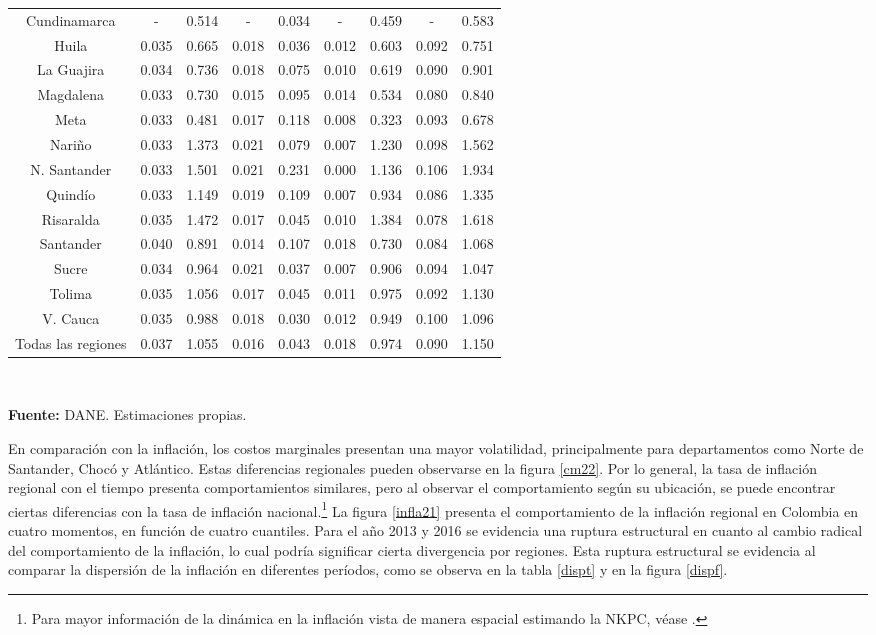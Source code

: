\begin{table}[H]
\begin{tabular}{c c c c c c c c c }
    Cundinamarca  & - & 0.514 & - & 0.034 & - & 0.459 & - & 0.583 \\
    Huila  & 0.035 & 0.665 & 0.018 & 0.036 & 0.012 & 0.603 & 0.092 & 0.751 \\
    La Guajira & 0.034 & 0.736 & 0.018 & 0.075 & 0.010 & 0.619 & 0.090 & 0.901 \\
    Magdalena  & 0.033 & 0.730 & 0.015 & 0.095 & 0.014 & 0.534 & 0.080 & 0.840 \\
    Meta  & 0.033 & 0.481 & 0.017 & 0.118 & 0.008 & 0.323 & 0.093 & 0.678 \\
    Nariño  & 0.033 & 1.373 & 0.021 & 0.079 & 0.007 & 1.230 & 0.098 & 1.562 \\
    N. Santander  & 0.033 & 1.501 & 0.021 & 0.231 & 0.000 & 1.136 & 0.106 & 1.934 \\
    Quindío  & 0.033 & 1.149 & 0.019 & 0.109 & 0.007 & 0.934 & 0.086 & 1.335 \\
    Risaralda  & 0.035 & 1.472 & 0.017 & 0.045 & 0.010 & 1.384 & 0.078 & 1.618 \\
    Santander  & 0.040 & 0.891 & 0.014 & 0.107 & 0.018 & 0.730 & 0.084 & 1.068 \\
    Sucre  & 0.034 & 0.964 & 0.021 & 0.037 & 0.007 & 0.906 & 0.094 & 1.047 \\
    Tolima  & 0.035 & 1.056 & 0.017 & 0.045 & 0.011 & 0.975 & 0.092 & 1.130 \\
    V. Cauca  & 0.035 & 0.988 & 0.018 & 0.030 & 0.012 & 0.949 & 0.100 & 1.096 \\
    Todas las regiones & 0.037 & 1.055 & 0.016 & 0.043 & 0.018 & 0.974 & 0.090 & 1.150 \\
     \hline
    \end{tabular}%
  \label{res3}\\
  \raggedright  \scriptsize \textbf{Fuente:} DANE. Estimaciones propias.
\end{table}%
 En comparación con la inflación, los costos marginales presentan una mayor volatilidad, principalmente para departamentos como Norte de Santander, Chocó y Atlántico. Estas diferencias regionales pueden observarse en la figura \ref{cm22}. Por lo general, la tasa de inflación regional con el tiempo presenta comportamientos similares, pero al observar el comportamiento según su ubicación, se puede encontrar ciertas diferencias  con la tasa de inflación nacional.\footnote{Para mayor información de la dinámica en  la inflación vista de manera espacial estimando la NKPC, véase \cite{yesilyurt2014regional,vaona2012regional}.} La figura \ref{infla21} presenta el comportamiento de la inflación regional en Colombia en cuatro momentos, en función de cuatro cuantiles. Para el año 2013 y 2016 se evidencia una ruptura estructural en cuanto al cambio radical del comportamiento de la inflación, lo cual  podría  significar cierta divergencia por regiones. Esta ruptura estructural se evidencia al comparar la dispersión de la inflación en diferentes períodos, como se observa en la tabla \ref{dispt} y en la figura \ref{dispf}. 


